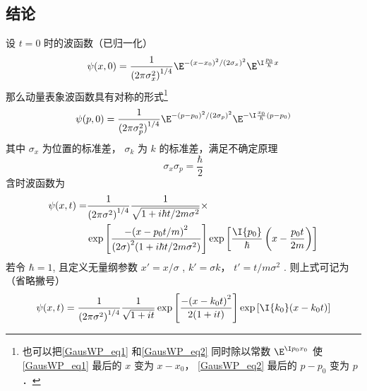 

\subsection{结论}
设 $t = 0$ 时的波函数（已归一化）
\begin{equation}\label{GausWP_eq1}
\psi (x,0) = \frac{1}{{{{(2\pi {\sigma_x ^2})}^{1/4}}}}{\E^{ - {{(x - {x_0})}^2}/{{(2\sigma_x )}^2}}}{\E^{\I \frac{p_0}{\hbar}x}}
\end{equation}
那么动量表象波函数具有对称的形式\footnote{也可以把\autoref{GausWP_eq1} 和\autoref{GausWP_eq2} 同时除以常数 $\E^{\I p_0 x_0}$ 使\autoref{GausWP_eq1} 最后的 $x$ 变为 $x-x_0$， \autoref{GausWP_eq2} 最后的 $p-p_0$ 变为 $p$． }
\begin{equation}\label{GausWP_eq2}
\psi (p,0) = \frac{1}{{{{(2\pi \sigma _p^2)}^{1/4}}}}{\E^{ - {{(p - {p_0})}^2}/{{(2{\sigma _p})}^2}}}{\E^{ - \I\frac{{{x_0}}}{\hbar }(p - {p_0})}}
\end{equation}
其中 $\sigma_x$ 为位置的标准差， $\sigma_k$ 为 $k$ 的标准差，满足不确定原理
\begin{equation}
\sigma_x\sigma_p = \frac{\hbar}{2}
\end{equation}
含时波函数为
\begin{equation}\begin{aligned}
\psi (x,t) = &\frac{1}{{{{(2\pi {\sigma ^2})}^{1/4}}}}\frac{1}{{\sqrt {1 + i\hbar t/2m{\sigma ^2}} }}\times\\
&\exp \left[ {\frac{{ - {{(x - {p_0}t/m)}^2}}}{{{{(2\sigma )}^2}(1 + i\hbar t/2m{\sigma ^2})}}} \right]\exp \left[ {\frac{{\I{p_0}}}{\hbar }\left( {x - \frac{{{p_0}t}}{{2m}}} \right)} \right]
\end{aligned}\end{equation}
若令 $\hbar  = 1$, 且定义无量纲参数 $x' = x/\sigma$ ,  $k' = \sigma k$， $t' = t/m\sigma^2$  . 则上式可记为（省略撇号）
\begin{equation}
\psi (x,t) = \frac{1}{{{{(2\pi {\sigma ^2})}^{1/4}}}}\frac{1}{{\sqrt {1 + it} }}\exp \left[ {\frac{{ - {{(x - {k_0}t)}^2}}}{{2(1 + it)}}} \right]\exp \left[ {\I {k_0}(x - {k_0}t)} \right]
\end{equation}

